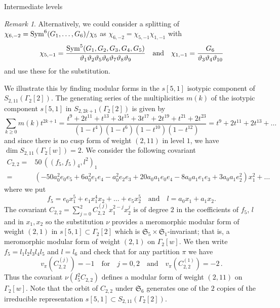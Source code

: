 \documentclass[12pt]{amsart}
\numberwithin{equation}{section}
\numberwithin{equation}{section}
\theoremstyle{definition}
\theoremstyle{remark}
\newtheorem{remark}[theorem]{Remark}
\begin{document}
\begin{section}{Intermediate levels}
\begin{remark}
Alternatively, we could consider a splitting of 
$ \chi_{6,-2}= {\rm Sym}^6(G_1,\ldots,G_6)/\chi_5$
as $\chi_{6,-2}=\chi_{5,-1}\chi_{1,-1}$ with
$$
\chi_{5,-1}= \frac{{\rm Sym}^5(G_1,G_2,G_3,G_4,G_5)}{\vartheta_1\vartheta_2\vartheta_5\vartheta_6\vartheta_7\vartheta_8\vartheta_9}
\quad \text{\rm and} \quad \chi_{1,-1}= \frac{G_6}{\vartheta_3\vartheta_4\vartheta_{10}}
$$
and use these for the substitution.
\end{remark}
\bigskip
We illustrate this by finding modular forms in the $s[5,1]$ isotypic component of $S_{2,11}(\Gamma_2[2])$.
The generating series of the multiplicities $m(k)$ of the isotypic component $s[5,1]$ in $S_{2,2k+1}(\Gamma_2[2])$ is given by
$$
\sum_{k\geqslant 0} m(k) t^{2k+1} =\frac{t^{9}+
2 t^{11}+t^{13}+3 t^{15}+3 t^{17}+2 t^{19}+t^{21}+2 t^{23}}{\left(1-t^{4}\right) \left(1-t^{6}\right) \left(1-t^{10}\right) \left(1-t^{12}\right)}=t^{9}+2 t^{11}+2 t^{13}+\ldots
$$
and since there is no cusp form of weight $(2,11)$ in level $1$, we have
$\dim S_{2,11}(\Gamma_2[w])=2$.
We consider the following covariant
\[
\begin{aligned}
C_{2,2}=& 50\,((f_5,f_5)_4,l^2)_1\\
 = & (-50 a_{0}^{2} e_{0} e_{5}+6 a_{0}^{2} e_{1} e_{4}-a_{0}^{2} e_{2} e_{3}+20 a_{0} a_{1} e_{0} e_{4}-8 a_{0} a_{1} e_{1} e_{3}+3 a_{0} a_{1} e_{2}^{2})x_1^2+\ldots
\end{aligned}
\]
where we put
\[
f_5=e_0x_1^5+e_1x_1^4x_2+\ldots+e_5x_2^5 \quad \text{and} \quad  l=a_0x_1+a_1x_2. 
\]
The covariant $C_{2,2}=\sum_{j=0}^2 C_{2,2}^{(j)}x_1^{2-j}x_2^j$ is 
of degree $2$ in the coefficients of $f_5$, $l$ and in $x_1, x_2$ 
so the substitution $\nu$ provides a meromorphic modular form of weight 
$(2,1)$ in $s[5,1]\subset\Gamma_2[2]$ which is $\mathfrak{S}_5\times \mathfrak{S}_1$-invariant; 
that is,  a meromorphic modular form of weight $(2,1)$ on $\Gamma_2[w]$.
We then write $f_5=l_1l_2l_3l_4l_5$ and $l=l_6$ and check that for any partition $\pi$ we have
\[
v_{\pi}(C_{2,2}^{(j)})=-1 \quad \text{for} \quad j=0, 2  \quad \text{and} \quad v_{\pi}(C_{2,2}^{(1)})=-2\, .
\]
Thus the covariant $\nu(I^2_5C_{2,2})$ defines a modular form of weight $(2,11)$ on $\Gamma_2[w]$.
 Note that the orbit of $C_{2,2}$ under $\mathfrak{S}_6$ generates one of the $2$ copies of the irreducible 
representation $s[5,1]\subset S_{2,11}(\Gamma_2[2])$.

\end{section}
\end{document}
